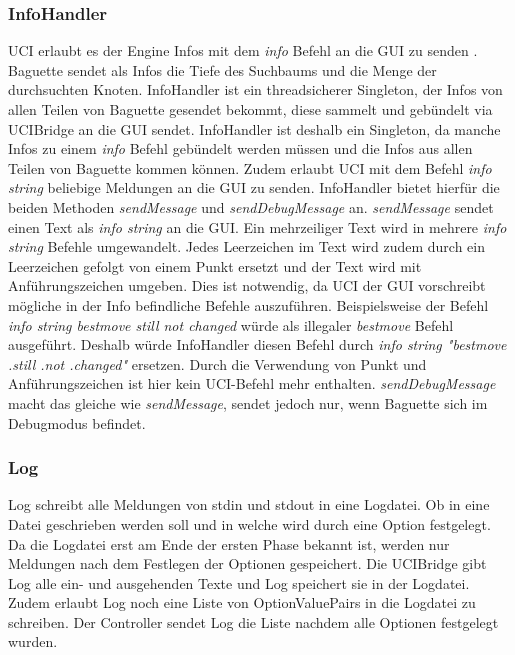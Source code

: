 \subsubsection{InfoHandler}\label{subsubsec:infohandler}
UCI erlaubt es der Engine Infos mit dem \textit{info} Befehl an die GUI zu senden \citeuci[248 - 313].
Baguette sendet als Infos die Tiefe des Suchbaums und die Menge der durchsuchten Knoten.
\newline
InfoHandler ist ein threadsicherer Singleton, der Infos von allen Teilen von Baguette gesendet bekommt, diese sammelt und
geb\"undelt via UCIBridge an die GUI sendet.
InfoHandler ist deshalb ein Singleton, da manche Infos zu einem \textit{info} Befehl geb\"undelt werden m\"ussen \citeuci[264]
und die Infos aus allen Teilen von Baguette kommen k\"onnen.
\newline
Zudem erlaubt UCI mit dem Befehl \textit{info string} \citeuci[297] beliebige Meldungen an die GUI zu senden.
InfoHandler bietet hierf\"ur die beiden Methoden \textit{sendMessage} und \textit{sendDebugMessage} an.
\newline\textit{sendMessage} sendet einen Text als \textit{info string} an die GUI\@.
Ein mehrzeiliger Text wird in mehrere \textit{info string} Befehle umgewandelt.
Jedes Leerzeichen im Text wird zudem durch ein Leerzeichen gefolgt von einem Punkt ersetzt
und der Text wird mit Anf\"uhrungszeichen umgeben.
Dies ist notwendig, da UCI der GUI vorschreibt m\"ogliche in der Info befindliche Befehle auszuf\"uhren\citeuci[299].
Beispielsweise der Befehl \textit{info string bestmove still not changed} w\"urde als illegaler \textit{bestmove} Befehl
ausgef\"uhrt.
Deshalb w\"urde InfoHandler diesen Befehl durch \textit{info string "bestmove .still .not .changed"} ersetzen.
Durch die Verwendung von Punkt und Anf\"uhrungszeichen ist hier kein UCI-Befehl mehr enthalten.
\newline\textit{sendDebugMessage} macht das gleiche wie \textit{sendMessage}, sendet jedoch nur, wenn Baguette sich im
Debugmodus befindet.

\subsubsection{Log}\label{subsubsec:log}
Log schreibt alle Meldungen von stdin und stdout in eine Logdatei.
Ob in eine Datei geschrieben werden soll und in welche wird durch eine Option festgelegt.
Da die Logdatei erst am Ende der ersten Phase bekannt ist, werden nur Meldungen nach dem Festlegen der Optionen gespeichert.
Die UCIBridge gibt Log alle ein- und ausgehenden Texte und Log speichert sie in der Logdatei.
\newline
Zudem erlaubt Log noch eine Liste von OptionValuePairs in die Logdatei zu schreiben.
Der Controller sendet Log die Liste nachdem alle Optionen festgelegt wurden.

